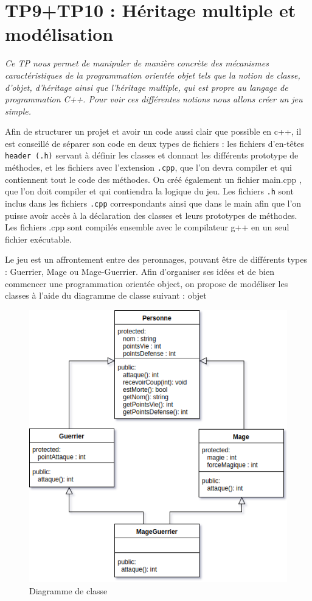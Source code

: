 \chapter{TP9+TP10 : Héritage multiple et modélisation}
\textit{Ce TP nous permet de manipuler de manière concrète des mécanismes caractéristiques de la programmation orientée objet tels que la notion de classe, d’objet, d’héritage ainsi que l’héritage multiple, qui est propre au langage de programmation C++.
Pour voir ces différentes notions nous allons créer un jeu simple.}

Afin de structurer un projet et avoir un code aussi clair que possible en c++, il est conseillé de séparer son
code en deux types de fichiers : les fichiers d’en-têtes \texttt{header (.h)} servant à définir les classes et
donnant les différents prototype de méthodes, et les fichiers avec l’extension \texttt{.cpp}, que l’on devra compiler et qui contiennent tout le code des méthodes. On créé également un fichier main.cpp , que l’on doit compiler et qui contiendra la logique du jeu.
Les fichiers \texttt{.h} sont inclus dans les fichiers \texttt{.cpp} correspondants ainsi que dans le main afin que l’on puisse avoir accès à la déclaration des classes et leurs prototypes de méthodes.
Les fichiers .cpp sont compilés ensemble avec le compilateur g++ en un seul fichier exécutable.

Le jeu est un affrontement entre des peronnages, pouvant être de différents types : Guerrier, Mage ou Mage-Guerrier.
Afin d'organiser ses idées et de bien commencer une programmation orientée object, on propose de modéliser les classes à l'aide du diagramme de classe suivant :
objet

\begin{figure}[!h]
\centering
\includegraphics[width=400pt]{./cpp/Pictures/tp9+10-inheritance}
\caption{Diagramme de classe}
\label{Diagramme de classe}
\end{figure}

